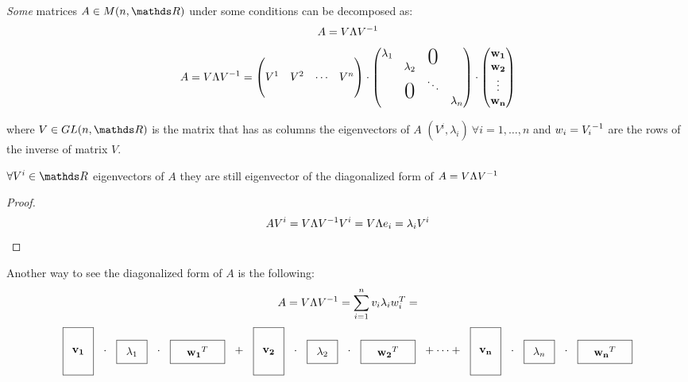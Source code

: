 \documentclass[computationalMathematics.tex]{subfiles}
\begin{document}
\begin{definition}
 \emph{Some} matrices $A \in M(n, \R)$ under some conditions can be decomposed as:
\[
  A = V \Lambda {V}^{-1}
\]
\[
  A = V \Lambda \inv{V} = \begin{pmatrix}
    \\
    V^1 & V^2 & \cdots & V^n\\
    \\
  \end{pmatrix}
  \cdot 
  \begin{pmatrix}
    \lambda_1&&\bigzero\\
    &\lambda_2\\
    &\bigzero& \ddots\\
    &&&\lambda_n\\
  \end{pmatrix}
  \cdot 
  \begin{pmatrix}
    \vect{w_1}\\
    \vect{w_2}\\
    \vdots\\
    \vect{w_n}\\
  \end{pmatrix}
\]

  where $V \in GL(n, \R)$ is the matrix that has as columns the eigenvectors of $A$ $(V^i, \lambda_i)~\forall i=1, \ldots, n$ and $w_i = {V_i}^{-1}$ are the rows of the inverse of matrix $V$.\\
\end{definition}

\begin{proposition}
  $\forall V^i \in \R$ eigenvectors of $A$ they are still eigenvector of the diagonalized form of $A=V \Lambda {V}^{-1}$
\end{proposition}

\begin{proof}
  \[
    AV^i = V \Lambda {V}^{-1} V^i = V \Lambda e_i = \lambda_i V^i
  \]
\end{proof}

Another way to see the diagonalized form of $A$ is the following:
\[
  A = V \Lambda {V}^{-1} = \sum\limits_{i=1}^{n} v_i\lambda_i w_i^T = 
\]
\[
  \tallthin{$\vect{v_1}$} \cdot \real{$\lambda_1$} \cdot \shortlarge{$\tr{\vect{w_1}}$} + \tallthin{$\vect{v_2}$} \cdot \real{$\lambda_2$} \cdot \shortlarge{$\tr{\vect{w_2}}$} + \cdots + \tallthin{$\vect{v_n}$} \cdot \real{$\lambda_n$} \cdot \shortlarge{$\tr{\vect{w_n}}$}
\]

\end{document}
